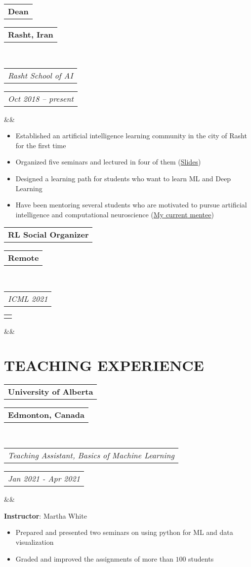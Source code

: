\documentclass[11pt,a4paper,roman,colorlinks,linkcolor=blue,filecolor=magenta,urlcolor=cyan]{moderncv}        %
\makeatletter
\newcommand*{\customcventry}[7][.25em]{
  \begin{tabular}{@{}l} 
    {\bfseries #4}
  \end{tabular}
  \hfill%
  \begin{tabular}{l@{}}
     {\bfseries #5}
  \end{tabular} \\
  \begin{tabular}{@{}l} 
    {\itshape #3}
  \end{tabular}
  \hfill%
  \begin{tabular}{l@{}}
     {\itshape #2}
  \end{tabular}
  \ifx&#7&%
  \else{\\%
    \begin{minipage}{\maincolumnwidth}%
      \small#7%
    \end{minipage}}\fi%
  \par\addvspace{#1}}
\newcommand*{\customcvproject}[4][.25em]{
  \begin{tabular}{@{}l} 
    {\bfseries #2}
  \end{tabular}
  \hfill%
  \begin{tabular}{l@{}}
     { #3}
  \end{tabular}
  \ifx&#4&%
  \else{\\%
    \begin{minipage}{\maincolumnwidth}%
      \small#4%
    \end{minipage}}\fi%
  \par\addvspace{#1}}
\makeatother
\begin{document}
            \vspace{1mm}
    		{\customcventry{Oct 2018 -- present}{Rasht School of AI}{Dean}{Rasht, Iran}{}{}}
    		\begin{itemize}
    		    \item Established an artificial intelligence learning community in the city of Rasht for the first time
    		    \item Organized five seminars and lectured in four of them (\href{https://github.com/rasht-school-of-ai/Meetup-Materials}{Slides})
    		    \item Designed a learning path for students who want to learn ML and Deep Learning
    		    \item Have been mentoring several students who are motivated to pursue artificial intelligence and computational neuroscience (\href{https://erfanmhi.github.io/pages/mentorship.html}{My current mentee})
    		\end{itemize}

            \vspace{1mm}
        	\customcventry{}{ICML 2021}{RL Social Organizer}{Remote}{}{}

\section{TEACHING EXPERIENCE}
{\customcventry{Jan 2021 - Apr 2021}{Teaching Assistant, Basics of Machine Learning}{University of Alberta}{Edmonton, Canada}{}{}
\textbf{Instructor}: Martha White

  \begin{itemize}
    \item Prepared and presented two seminars on using python for ML and data visualization
    \item Graded and improved the assignments of more than $100$ students
    \end{itemize}
}
\end{document}
